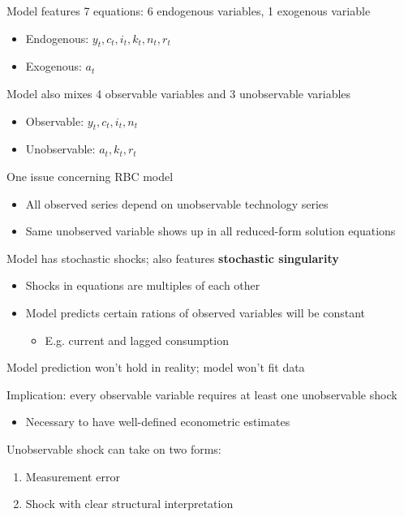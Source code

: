 \documentclass{beamer}
\begin{document}
\begin{frame}
  Model features 7 equations: 6 endogenous variables, 1 exogenous variable
\begin{itemize}
  \item Endogenous: $y_t,c_t,i_t,k_t,n_t,r_t$
  \item Exogenous: $a_t$
\end{itemize}
\medskip
Model also mixes 4 observable variables and 3 unobservable variables
\begin{itemize}
  \item Observable: $y_t,c_t,i_t,n_t$
  \item Unobservable: $a_t, k_t, r_t$
\end{itemize}
\end{frame}

\begin{frame}
  One issue concerning RBC model
  \begin{itemize}
    \item All observed series depend on unobservable technology series
    \item Same unobserved variable shows up in all reduced-form solution equations
  \end{itemize}
  \medskip
  Model has stochastic shocks; also features \textbf{stochastic singularity}
  \begin{itemize}
    \item Shocks in equations are multiples of each other
    \item Model predicts certain rations of observed variables will be constant
    \begin{itemize}
      \item E.g. current and lagged consumption
    \end{itemize}    
  \end{itemize}
  \medskip
  Model prediction won't hold in reality; model won't fit data  
\end{frame}

\begin{frame}
 Implication: every observable variable requires at least one unobservable shock
 \begin{itemize}
   \item Necessary to have well-defined econometric estimates
 \end{itemize}
 \medskip
  Unobservable shock can take on two forms: 
\begin{enumerate}
  \item Measurement error
  \item Shock with clear structural interpretation
\end{enumerate}
\end{frame}
\end{document}
